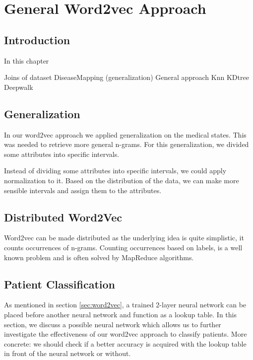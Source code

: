 \graphicspath{ {Approach/Images/} }


\chapter{General Word2vec Approach}
\label{cha:approach}

\section{Introduction}
In this chapter 

Joins of dataset
DiseaseMapping (generalization)
General approach 
Knn
KDtree
Deepwalk


\section{Generalization}

In our word2vec approach we applied generalization on the medical states. This was needed to retrieve more general n-grams. For this generalization, we divided some attributes into specific intervals.

Instead of dividing some attributes into specific intervals, we could apply normalization to it. Based on the distribution of the data, we can make more sensible intervals and assign them to the attributes.


\section{Distributed Word2Vec}

Word2vec can be made distributed as the underlying idea is quite simplistic, it counts occurrences of n-grams. Counting occurrences based on labels, is a well known problem and is often solved by MapReduce algorithms. 


\section{Patient Classification}

As mentioned in section \ref{sec:word2vec}, a trained 2-layer neural network can be placed before another neural network and function as a lookup table. In this section, we discuss a possible neural network which allows us to further investigate the effectiveness of our word2vec approach to classify patients. More concrete: we should check if a better accuracy is acquired with the lookup table in front of the neural network or without. 

